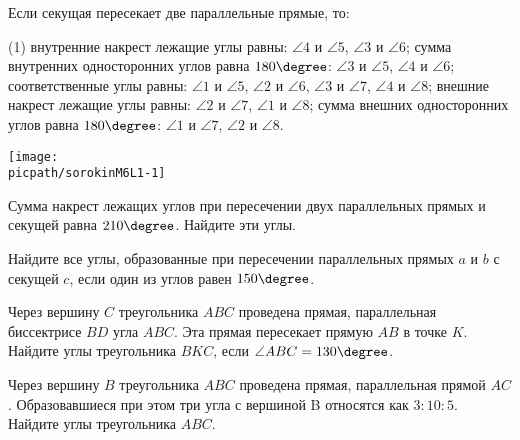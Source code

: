 %
%

\begin{class}[number=1]
	\begin{definit}
		Если секущая пересекает две параллельные прямые, то:
		\begin{tasks}(1)
			\task внутренние накрест лежащие углы равны: \( \angle 4 \) и \( \angle5 \), \( \angle 3 \) и \( \angle 6\);
			\task сумма внутренних односторонних углов равна  \(180\degree\): \( \angle 3 \) и \( \angle 5 \), \( \angle 4 \) и \( \angle 6 \);
			\task соответственные углы равны: \( \angle 1 \) и \( \angle 5 \), \( \angle 2 \) и \( \angle 6 \), \( \angle 3 \) и \( \angle 7 \), \( \angle 4 \) и \( \angle 8 \);
			\task внешние накрест лежащие углы равны: \( \angle 2 \) и \( \angle 7 \), \( \angle 1 \) и \( \angle 8 \);
			\task сумма внешних односторонних углов равна  \(180\degree\): \( \angle 1 \) и \( \angle 7 \), \( \angle 2 \) и \( \angle 8 \).
		\end{tasks}
		\begin{minipage}[c]{0.9\linewidth}
			\texttt{[image: \\picpath/sorokinM6L1-1]}
		\end{minipage}
	\end{definit}
	\begin{listofex}
		\item Сумма накрест лежащих углов при пересечении двух параллельных прямых и секущей равна \(210 \degree \). Найдите эти углы.
		\item Найдите все углы, образованные при пересечении параллельных прямых \(a\) и \(b\) с секущей \(c\), если один из углов равен \( 150 \degree \).
		\item Через вершину \(C\) треугольника \(ABC\) проведена прямая, параллельная биссектрисе \(BD\) угла \(ABC\). Эта прямая пересекает прямую \(AB\) в точке \(K\). Найдите углы треугольника \(BKC\), если \(\angle ABC = 130 \degree\).
		\item Через вершину \(B\) треугольника \(ABC\) проведена прямая, параллельная прямой \(AC\). Образовавшиеся при этом три угла с вершиной B относятся как \(3 : 10 : 5\). Найдите углы треугольника \(ABC\).

\end{listofex}
\end{class}
